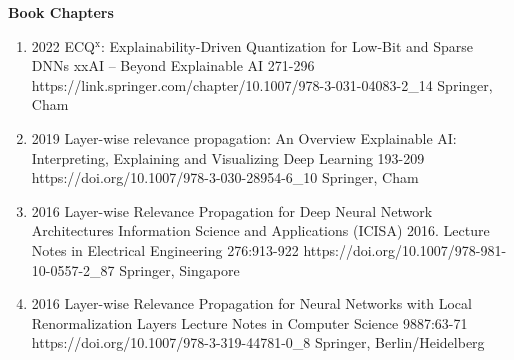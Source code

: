 \headedsection
{\bf Book Chapters}{}
{
    \begin{enumerate}


        \item {}
                            {2022}
                            {ECQ$^{\textrm{x}}$: Explainability-Driven Quantization for Low-Bit and Sparse DNNs}
                            {xxAI -- Beyond Explainable AI}
                            {271-296}
                            {https://link.springer.com/chapter/10.1007/978-3-031-04083-2_14}
                            {Springer, Cham}

        \item {}
                            {2019}
                            {Layer-wise relevance propagation: An Overview}
                            {Explainable AI: Interpreting, Explaining and Visualizing Deep Learning}
                            {193-209}
                            {https://doi.org/10.1007/978-3-030-28954-6_10}
                            {Springer, Cham}

        \item {}
                            {2016}
                            {Layer-wise Relevance Propagation for Deep Neural Network Architectures}
                            {Information Science and Applications (ICISA) 2016. Lecture Notes in Electrical Engineering}
                            {276:913-922}
                            {https://doi.org/10.1007/978-981-10-0557-2_87}
                            {Springer, Singapore}

        \item {}
                            {2016}
                            {Layer-wise Relevance Propagation for Neural Networks with Local Renormalization Layers}
                            {Lecture Notes in Computer Science}
                            {9887:63-71}
                            {https://doi.org/10.1007/978-3-319-44781-0_8}
                            {Springer, Berlin/Heidelberg}
    \end{enumerate}

}
